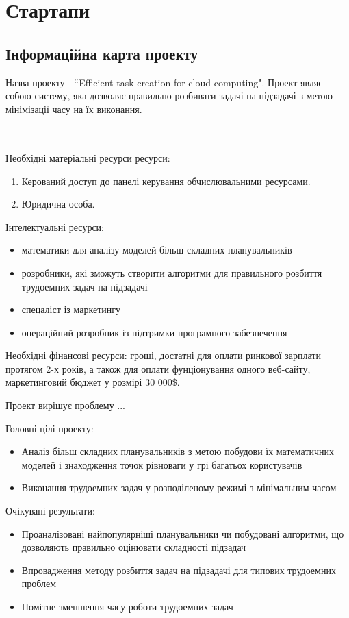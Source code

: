 \chapter{Стартапи}
\section{Інформаційна карта проекту}
Назва проекту - ``Efficient task creation for cloud computing". Проект являє собою систему, яка дозволяє правильно розбивати задачі на підзадачі з метою мінімізації часу на їх виконання.
\begin{tabular}
  {|l|p{8cm}|}
\hline

\end{tabular}
\\
Необхідні матеріальні ресурси ресурси:
\begin{enumerate}
\item Керований доступ до панелі керування обчислювальними ресурсами.
\item Юридична особа.
\end{enumerate}
Інтелектуальні ресурси:
\begin{itemize}
  \item математики для аналізу моделей більш складних планувальників
  \item розробники, які зможуть створити алгоритми для правильного розбиття трудоемних задач на підзадачі
  \item спецаліст із маркетингу
  \item операційний розробник із підтримки програмного забезпечення
\end{itemize}
Необхідні фінансові ресурси: гроші, достатні для оплати ринкової зарплати протягом 2-х років, а також для оплати фунціонування одного веб-сайту, маркетинговий бюджет у розмірі 30 000\$.

Проект вирішує проблему ...

Головні цілі проекту:
\begin{itemize}
  \item Аналіз більш складних планувальників з метою побудови їх математичних моделей і знаходження точок рівноваги у грі багатьох користувачів
  \item Виконання трудоемних задач у розподіленому режимі з мінімальним часом
\end{itemize}

Очікувані результати:
\begin{itemize}
  \item Проаналізовані найпопулярніші планувальники чи побудовані алгоритми, що дозволяють правильно оцінювати складності підзадач
  \item Впровадження методу розбиття задач на підзадачі для типових трудоемних проблем
  \item Помітне зменшення часу роботи трудоемних задач
\end{itemize}

